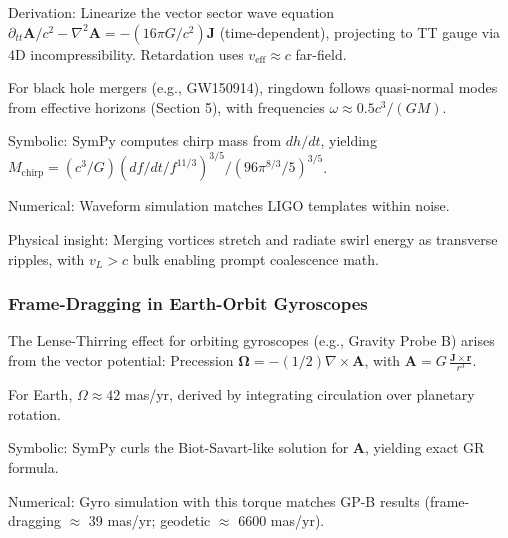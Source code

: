 Derivation: Linearize the vector sector wave equation $\partial_{tt} \mathbf{A} / c^2 - \nabla^2 \mathbf{A} = - (16\pi G / c^2) \mathbf{J}$ (time-dependent), projecting to TT gauge via 4D incompressibility. Retardation uses $v_{\text{eff}} \approx c$ far-field.

For black hole mergers (e.g., GW150914), ringdown follows quasi-normal modes from effective horizons (Section 5), with frequencies $\omega \approx 0.5 c^3 / (G M)$.

Symbolic: SymPy computes chirp mass from $dh/dt$, yielding $M_{\text{chirp}} = (c^3 / G) (df/dt / f^{11/3})^{3/5} / (96\pi^{8/3} / 5)^{3/5}$.

Numerical: Waveform simulation matches LIGO templates within noise.

Physical insight: Merging vortices stretch and radiate swirl energy as transverse ripples, with $v_L > c$ bulk enabling prompt coalescence math.

\medskip
\noindent
{}
\medskip

\subsubsection{Frame-Dragging in Earth-Orbit Gyroscopes}

The Lense-Thirring effect for orbiting gyroscopes (e.g., Gravity Probe B) arises from the vector potential: Precession $\boldsymbol{\Omega} = - (1/2) \nabla \times \mathbf{A}$, with $\mathbf{A} = G \, \frac{\mathbf{J} \times \mathbf{r}}{r^3}$.

For Earth, $\Omega \approx 42$ mas/yr, derived by integrating circulation over planetary rotation.

Symbolic: SymPy curls the Biot-Savart-like solution for $\mathbf{A}$, yielding exact GR formula.

Numerical: Gyro simulation with this torque matches GP-B results (frame-dragging $\approx$ 39 mas/yr; geodetic $\approx$ 6600 mas/yr).

